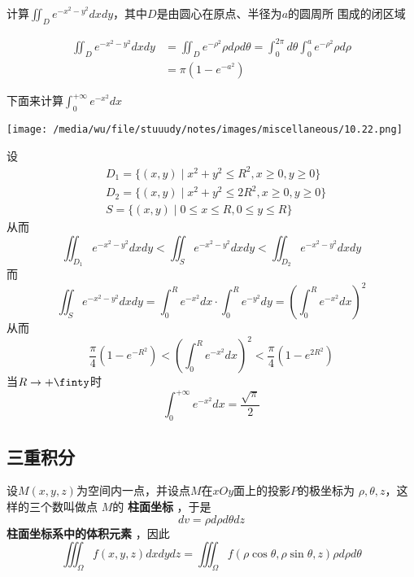 \documentclass[11pt]{article}
\begin{document}
\begin{examplle}[]
计算\(\iint_De^{-x^2-y^2}dxdy\)，其中\(D\)是由圆心在原点、半径为\(a\)的圆周所
围成的闭区域


\begin{align*}
\iint_De^{-x^2-y^2}dxdy&=
\iint_De^{-\rho^2}\rho d\rho d\theta=\int_0^{2\pi}d\theta\int_0^ae^{-\rho^2}\rho d\rho\\
&=\pi(1-e^{-a^2})
\end{align*}

下面来计算\(\int_0^{+\infty}e^{-x^2}dx\)

\begin{center}
\texttt{[image: /media/wu/file/stuuudy/notes/images/miscellaneous/10.22.png]}
\end{center}
设
\begin{align*}
&D_1=\{(x,y)\mid x^2+y^2\le R^2,x\ge0,y\ge0\}\\
&D_2=\{(x,y)\mid x^2+y^2\le 2R^2,x\ge0,y\ge0\}\\
&S=\{(x,y)\mid 0\le x\le R,0\le y\le R\}
\end{align*}
从而
\begin{equation*}
\iint_{D_1}e^{-x^2-y^2}dxdy<\iint_Se^{-x^2-y^2}dxdy<\iint_{D_2}e^{-x^2-y^2}dxdy
\end{equation*}
而
\begin{equation*}
\iint_Se^{-x^2-y^2}dxdy=\int_0^Re^{-x^2}dx\cdot\int_0^Re^{-y^2}dy=
(\int_0^Re^{-x^2}dx)^2
\end{equation*}
从而
\begin{equation*}
\frac{\pi}{4}(1-e^{-R^2})<(\int_0^Re^{-x^2}dx)^2<\frac{\pi}{4}(1-e^{2R^2})
\end{equation*}
当\(R\to+\finty\)时
\begin{equation*}
\int_0^{+\infty}e^{-x^2}dx=\frac{\sqrt{\pi}}{2}
\end{equation*}
\end{examplle}
\subsection{三重积分}
\label{sec:orgba3611f}
设\(M(x,y,z)\)为空间内一点，并设点\(M\)在\(xOy\)面上的投影\(P\)的极坐标为
\(\rho,\theta,z\)，这样的三个数叫做点 \(M\)的 \textbf{柱面坐标} ，于是
\begin{equation*}
dv=\rho d\rho d\theta dz
\end{equation*}
\textbf{柱面坐标系中的体积元素} ，因此
\begin{equation*}
\iiint_\Omega f(x,y,z)dxdydz=\iiint_{\Omega}f(\rho\cos\theta,\rho\sin\theta,z)\rho
d \rho d\theta
\end{equation*}
\end{document}
